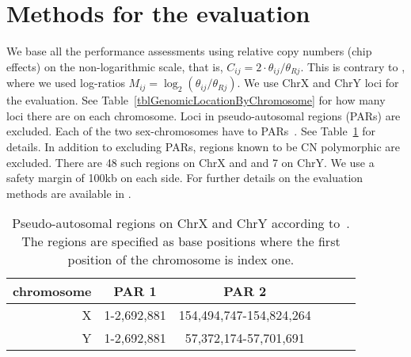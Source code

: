 \documentclass[10pt,a4paper]{article}
\begin{document}
\section{Methods for the evaluation}
We base all the performance assessments using relative copy numbers (chip effects) on the non-logarithmic scale, that is, $C_{ij}=2\cdot\theta_{ij}/\theta_{Rj}$.  This is contrary to \cite{BengtssonH_etal_2008}, where we used log-ratios $M_{ij}=\log_2(\theta_{ij}/\theta_{Rj})$.  
We use ChrX and ChrY loci for the evaluation.  See Table~\ref{tblGenomicLocationByChromosome} for how many loci there are on each chromosome.
Loci in pseudo-autosomal regions (PARs) are excluded.  Each of the two sex-chromosomes have to PARs~\citep{BlaschkeRappold_2006}.  See Table~\ref{tblPARs} for details.
In addition to excluding PARs, regions known to be CN polymorphic \citep{RedonR_etal_2006} are excluded.  There are 48 such regions on ChrX and and 7 on ChrY.  We use a safety margin of 100kb on each side.
For further details on the evaluation methods are available in \cite{BengtssonH_etal_2008}.

\begin{table}[hp]
\begin{center}
\begin{tabular}{|r|c|c|c|cc|}
\hline
chromosome & PAR 1 & PAR 2 \\
\hline
\hline
X  & 1-2,692,881 & 154,494,747-154,824,264 \\
Y  & 1-2,692,881 &  57,372,174-57,701,691 \\
\hline
\end{tabular}
\end{center}
\caption{Pseudo-autosomal regions on ChrX and ChrY according to~\citet{BlaschkeRappold_2006}.  The regions are specified as base positions where the first position of the chromosome is index one.}
\label{tblPARs}
\end{table}
\end{document}
